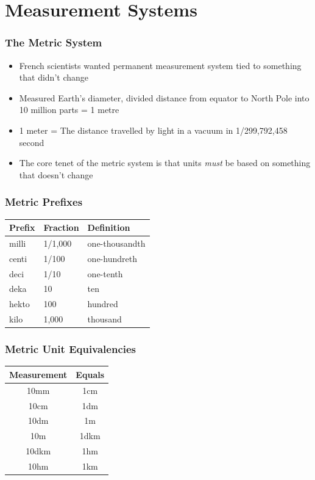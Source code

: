 \section{Measurement Systems}

\begin{frame}
	\frametitle{The Metric System}
    \begin{itemize}[<+- | alert@+>]
        \item French scientists wanted permanent measurement system tied to something that didn't change
        \item[1793] Measured Earth's diameter, divided distance from equator to North Pole into 10 million parts = 1 metre
        \item[Current] 1 meter = The distance travelled by light in a vacuum in 1/299,792,458 second
        \item The core tenet of the metric system is that units \emph{must} be based on something that doesn't change
    \end{itemize}
\end{frame}

\begin{frame}
	\frametitle{Metric Prefixes}
    \begin{table}
        \centering
        \begin{tabular}{lll}
            \hline
            Prefix & Fraction & Definition\\
            \hline
            milli & 1/1,000 & one-thousandth\\
            centi & 1/100 & one-hundreth\\
            deci & 1/10 & one-tenth\\
            deka & 10 & ten\\
            hekto & 100 & hundred\\
            kilo & 1,000 & thousand\\
            \hline
        \end{tabular}
    \end{table}
\end{frame}

\begin{frame}
	\frametitle{Metric Unit Equivalencies}
    \begin{table}
        \centering
        \begin{tabular}{cc}
            \hline
            Measurement & Equals\\
            \hline
            10mm & 1cm\\
            10cm & 1dm\\
            10dm & 1m\\
            10m & 1dkm\\
            10dkm & 1hm\\
            10hm & 1km\\
            \hline
        \end{tabular}
    \end{table}
\end{frame}

